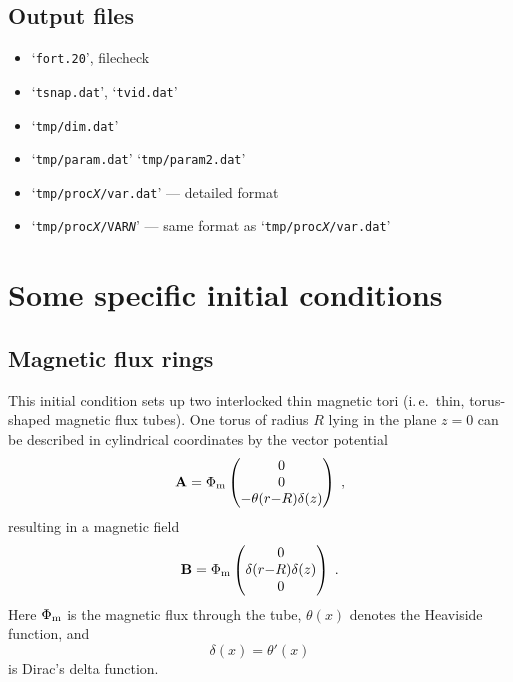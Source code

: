 \documentclass[12pt,twoside,notitlepage,a4paper]{article}
\newcommand{\file}[1]{`\texttt{#1}'}
\newcommand{\vekt}[1] {\mathbf{#1}}
\newcommand{\Av}            {\vekt{A}}
\newcommand{\Bv}            {\vekt{B}}
\newcommand{\Heavi}         {\theta}
\begin{document}
\subsection{Output files}

\begin{itemize}
\item \file{fort.20}, file{check}
\item \file{tsnap.dat}, \file{tvid.dat}
\item \file{tmp/dim.dat}
\item \file{tmp/param.dat} \file{tmp/param2.dat}
\item \file{tmp/proc\emph{X}/var.dat} --- detailed format
\item \file{tmp/proc\emph{X}/VAR\emph{N}} ---
  same format as \file{tmp/proc\emph{X}/var.dat}
\end{itemize}



\section{Some specific initial conditions}

\subsection{Magnetic flux rings}
This initial condition sets up two interlocked thin magnetic tori
(i.\,e.~thin, torus-shaped magnetic flux tubes).
One torus of radius $R$ lying in the plane $z=0$ can be described in
cylindrical coordinates by the
vector potential
\begin{equation} \label{Av-flux-ring-cyl}
  \Av = 
  \Phi_{\rm m}
  \begin{pmatrix}
    0\\ 0\\ -\Heavi(r{-}R) \delta(z)
  \end{pmatrix} \; ,
\end{equation}
resulting in a magnetic field
\begin{equation}
  \Bv = 
  \Phi_{\rm m}
  \begin{pmatrix}
    0\\ \delta(r{-}R) \delta(z)\\ 0
  \end{pmatrix} \; .
\end{equation}
Here $\Phi_{\rm m}$ is the magnetic flux through the tube,
$\Heavi(x)$ denotes the Heaviside function, and
\begin{equation} \label{Heavi-Dirac}
 \delta(x) = \Heavi'(x)
\end{equation}
is Dirac's delta function.
\end{document}
